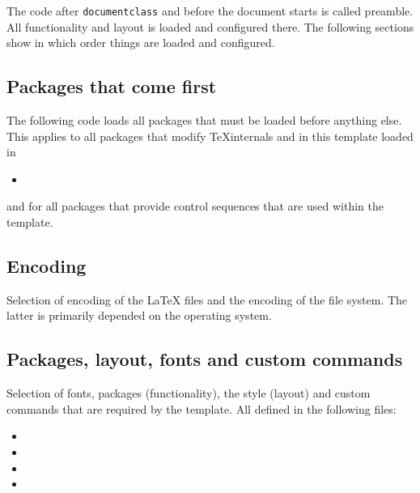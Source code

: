 The code after \texttt{documentclass} and before the document starts is called preamble. All functionality and layout is loaded and configured there. The following sections show in which order things are loaded and configured.

\subsection{Packages that come first}
\label{sec:preamble:firstpackages}

The following code loads all packages that must be loaded before anything else.
This applies to all packages that modify \TeX internals and in this template 
loaded in 
\begin{itemize}[noitemsep]
\item {}
\end{itemize}
and for all packages that provide control sequences that are used within the template.

\subsection{Encoding}
\label{sec:preamble:encoding}

Selection of encoding of the LaTeX files and the encoding of the file system. The latter is primarily depended on the operating system.

\subsection{Packages, layout, fonts and custom commands}
\label{sec:preamble:packages}

Selection of fonts, packages (functionality), the style (layout) and custom 
commands that are required by the template. All defined in the following files:
%
\begin{itemize}[noitemsep]
\item {}
\item {}
\item {}
\item {}
\end{itemize}

